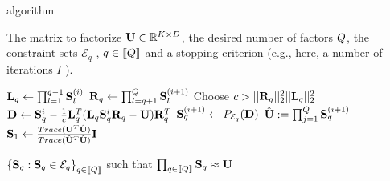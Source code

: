 \begin{algorithm}
	\caption{\palm algorithm}
	\label{algo:palm4msa}
	\begin{algorithmic}[1]
		
		\REQUIRE The matrix to factorize ${\mathbf{U}} \in \mathbb{R}^{K \times D}$, the desired number of factors $Q$, the constraint sets $\mathcal{E}_q$ , $q\in \left \llbracket Q\right \rrbracket$ and a stopping criterion (e.g., here, a number of iterations $I$ ).
		
		
		\STATE  ${\mathbf{L}}_q \leftarrow \prod_{l=1}^{q-1} {\mathbf{S}}_{l}^{(i)}$
		\STATE  ${\mathbf{R}}_q \leftarrow \prod_{l=q+1}^{Q} {\mathbf{S}}_{l}^{(i+1)}$
		\STATE Choose $c > ||{\mathbf{R}}_q||_2^2 ||{\mathbf{L}}_q||_2^2$
		\STATE ${\mathbf{D}} \leftarrow {\mathbf{S}}_q^i - \frac{1}{c} {\mathbf{L}}_q^T({\mathbf{L}}_q {\mathbf{S}}_q^i {\mathbf{R}}_q - {\mathbf{U}}){\mathbf{R}}_q^T$
		\STATE ${\mathbf{S}}^{(i+1)}_q \leftarrow P_{\mathcal{E}_q}({\mathbf{D}})$
		\ENDFOR
		\STATE $\hat {{\mathbf{U}}} := \prod_{j=1}^{Q} {\mathbf{S}}_q^{(i+1)}$
		\STATE ${\mathbf{S}}_1 \leftarrow \frac{Trace({\mathbf{U}}^T\hat{{\mathbf{U}}})}{Trace(\hat{{\mathbf{U}}}^T\hat{{\mathbf{U}}})} {\mathbf{I}}$
		\ENDFOR
		
		\ENSURE $\left \lbrace {\mathbf{S}}_q : {\mathbf{S}}_q \in \mathcal{E}_q\right \rbrace_{q\in\left \llbracket Q\right \rrbracket}$ such that $\prod_{q\in\left \llbracket Q\right \rrbracket}{\mathbf{S}}_q \approx {\mathbf{U}}$
		
	\end{algorithmic}
\end{algorithm}

